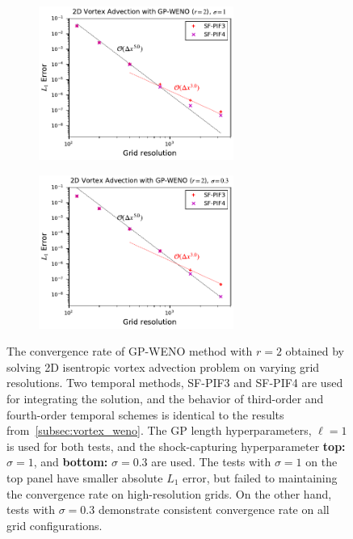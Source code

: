 \begin{figure}
    \centering
    \begin{subfigure}{\textwidth}
        \centering
        \includegraphics[width=0.7\textwidth]{fig/gp2_vortex_error_sigma1}
    \end{subfigure}
    \begin{subfigure}{\textwidth}
        \centering
        \includegraphics[width=0.7\textwidth]{fig/gp2_vortex_error_sigma03}
    \end{subfigure}
    \caption{The convergence rate of GP-WENO method with \( r=2 \) obtained by solving
        2D isentropic vortex advection problem on varying grid resolutions.
        Two temporal methods, SF-PIF3 and SF-PIF4 are used for integrating the solution,
        and the behavior of third-order and fourth-order temporal schemes
        is identical to the results from~\cref{subsec:vortex_weno}.
        The GP length hyperparameters, \( \ell = 1 \) is used for both tests,
        and the shock-capturing hyperparameter
        \textbf{top:} \( \sigma = 1 \), and \textbf{bottom:} \( \sigma = 0.3 \)
        are used.
        The tests with \( \sigma = 1 \) on the top panel have smaller absolute \( L_{1} \) error,
        but failed to maintaining the convergence rate on high-resolution grids.
        On the other hand, tests with \( \sigma = 0.3 \) demonstrate consistent
        convergence rate on all grid configurations.
    }\label{fig:gp_vortex_convergence}
\end{figure}

